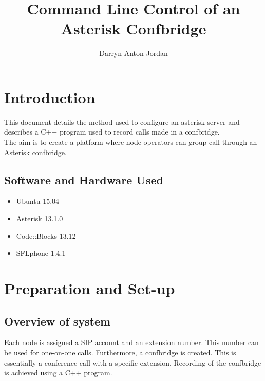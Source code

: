 \documentclass[a4paper,11pt]{report}
\title{Command Line Control of an Asterisk Confbridge}
\author{Darryn Anton Jordan}
\begin{document}
\maketitle
\tableofcontents


\newpage

\section{Introduction}
This document details the method used to configure an asterisk server and describes a C++ program used to record calls made in a confbridge.\\ The aim is to create a platform where node operators can group call through an Asterisk confbridge. 

\subsection{Software and Hardware Used}
\begin{itemize}
  \item Ubuntu 15.04
  \item Asterisk 13.1.0
  \item Code::Blocks 13.12
  \item SFLphone 1.4.1
\end{itemize}

\newpage

\section{Preparation and Set-up}
\subsection{Overview of system}
Each node is assigned a SIP account and an extension number. This number can be used for one-on-one calls. Furthermore, a confbridge is created. This is essentially a conference call with a specific extension. Recording of the confbridge is achieved using a C++ program. 
\end{document}
